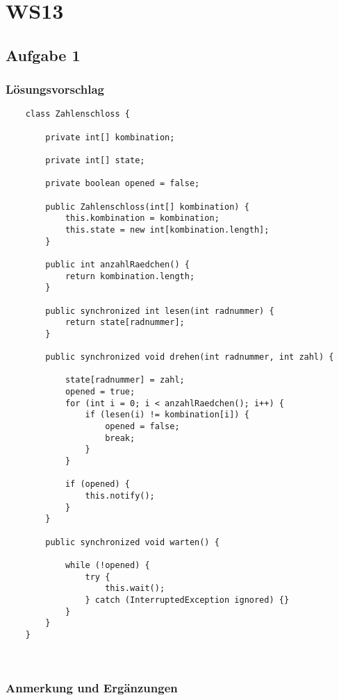 \chapter{WS13}\label{ch:klausurws13}

\section{Aufgabe 1}
\subsection{Lösungsvorschlag}


\begin{verbatim}
    class Zahlenschloss {

        private int[] kombination;

        private int[] state;

        private boolean opened = false;

        public Zahlenschloss(int[] kombination) {
            this.kombination = kombination;
            this.state = new int[kombination.length];
        }

        public int anzahlRaedchen() {
            return kombination.length;
        }

        public synchronized int lesen(int radnummer) {
            return state[radnummer];
        }

        public synchronized void drehen(int radnummer, int zahl) {

            state[radnummer] = zahl;
            opened = true;
            for (int i = 0; i < anzahlRaedchen(); i++) {
                if (lesen(i) != kombination[i]) {
                    opened = false;
                    break;
                }
            }

            if (opened) {
                this.notify();
            }
        }

        public synchronized void warten() {

            while (!opened) {
                try {
                    this.wait();
                } catch (InterruptedException ignored) {}
            }
        }
    }
\end{verbatim}\\


\subsection{Anmerkung und Ergänzungen}

